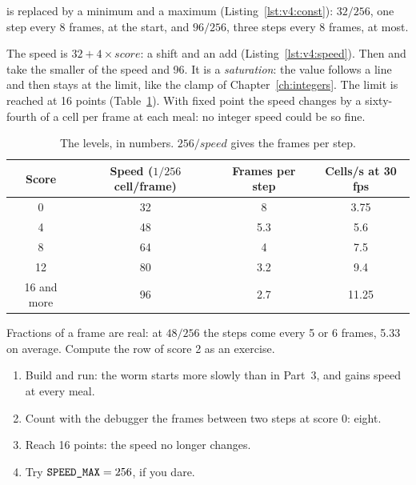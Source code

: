  is replaced by a minimum and a maximum
(Listing~\ref{lst:v4:const}): $32/256$, one step every 8 frames, at the
start, and $96/256$, three steps every 8 frames, at most.


The speed is $32+4\times\mathit{score}$: a shift and an add
(Listing~\ref{lst:v4:speed}). Then  and  take the smaller of
the speed and 96. It is a \emph{saturation}: the value follows a line and
then stays at the limit, like the clamp of Chapter~\ref{ch:integers}. The
limit is reached at 16 points (Table~\ref{tab:v4:levels}). With fixed point
the speed changes by a sixty-fourth of a cell per frame at each meal: no
integer speed could be so fine.

\begin{table}[htb]
\centering\small
\caption{The levels, in numbers. $256/\mathit{speed}$ gives the frames per
step.}\label{tab:v4:levels}
\begin{tabular}{@{}cccc@{}}
\toprule
\textbf{Score} & \textbf{Speed ($1/256$ cell/frame)} & \textbf{Frames per step} & \textbf{Cells/s at 30 fps}\\
\midrule
0 & 32 & 8 & 3.75\\
4 & 48 & 5.3 & 5.6\\
8 & 64 & 4 & 7.5\\
12 & 80 & 3.2 & 9.4\\
16 and more & 96 & 2.7 & 11.25\\
\bottomrule
\end{tabular}
\end{table}

Fractions of a frame are real: at $48/256$ the steps come every 5 or 6
frames, 5.33 on average. Compute the row of score 2 as an exercise.

\begin{prgcheck}
\begin{enumerate}[nosep]
\item Build and run: the worm starts more slowly than in Part~3, and gains
  speed at every meal.
\item Count with the debugger the frames between two steps at score 0: eight.
\item Reach 16 points: the speed no longer changes.
\item Try $\texttt{SPEED\_MAX}=256$, if you dare.
\end{enumerate}
\end{prgcheck}

